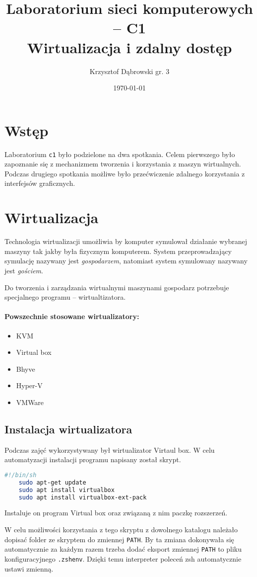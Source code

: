 \documentclass{article}
\title{Laboratorium sieci komputerowych -- C1 \\ Wirtualizacja i zdalny dostęp}
\author{Krzysztof Dąbrowski gr. 3}
\date{\today}
\begin{document}
\maketitle{}
\tableofcontents{}
\newpage

\section{Wstęp}
Laboratorium \texttt{c1} było podzielone na dwa spotkania. Celem pierwszego było zapoznanie się z mechanizmem tworzenia i korzystania z maszyn wirtualnych. Podczas drugiego spotkania możliwe było przećwiczenie zdalnego korzystania z interfejsów graficznych.

\section{Wirtualizacja}
Technologia wirtualizacji umożliwia by komputer symulował działanie wybranej maszyny tak jakby była fizycznym komputerem. System przeprowadzający symulację nazywany jest \textit{gospodarzem}, natomiast system symulowany nazywany jest \textit{gościem}.

Do tworzenia i zarządzania wirtualnymi maszynami gospodarz potrzebuje specjalnego programu -- wirtualtizatora.

\paragraph{Powszechnie stosowane wirtualizatory:}
\begin{itemize}
    \item KVM
    \item Virtual box
    \item Bhyve
    \item Hyper-V
    \item VMWare
\end{itemize}

\subsection{Instalacja wirtualizatora}
Podczas zajęć wykorzystywany był wirtualizator Virtaul box. W celu automatyzacji instalacji programu napisany został skrypt.
\begin{lstlisting}[language=sh]
    #!/bin/sh
    sudo apt-get update
    sudo apt install virtualbox
    sudo apt install virtualbox-ext-pack 
\end{lstlisting}
Instaluje on program Virtual box oraz związaną z nim paczkę rozszerzeń. 

W celu możliwości korzystania z tego skryptu z dowolnego katalogu należało dopisać folder ze skryptem do zmiennej \texttt{PATH}. By ta zmiana dokonywała się automatycznie za każdym razem trzeba dodać eksport zmiennej \texttt{PATH} to pliku konfiguracyjnego \texttt{.zshenv}. Dzięki temu interpreter poleceń zsh automatycznie ustawi zmienną.
\end{document}
